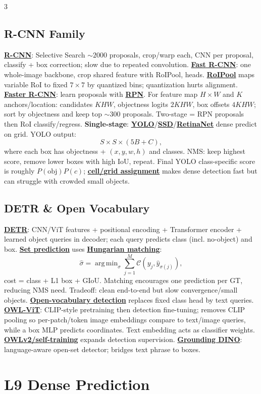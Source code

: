 \documentclass{article}
\numberwithin{equation}{subsection}
\newcommand{\key}[1]{\textbf{#1}}
\newcommand{\lowterm}[1]{\textbf{\underline{#1}}}
\DeclareMathOperator*{\argmin}{arg\,min}
\begin{document}
\begin{multicols*}{3}
\subsection{R-CNN Family}
\lowterm{R-CNN}: Selective Search $\sim2000$ proposals, crop/warp each, CNN per proposal, classify + box correction; slow due to repeated convolution. \lowterm{Fast R-CNN}: one whole-image backbone, crop shared feature with RoIPool, heads. \lowterm{RoIPool} maps variable RoI to fixed $7\times7$ by quantized bins; quantization hurts alignment. \lowterm{Faster R-CNN}: learn proposals with \lowterm{RPN}. For feature map $H\times W$ and $K$ anchors/location: candidates $KHW$, objectness logits $2KHW$, box offsets $4KHW$; sort by objectness and keep top $\sim300$ proposals. Two-stage = RPN proposals then RoI classify/regress.
\key{Single-stage}: \lowterm{YOLO}/\lowterm{SSD}/\lowterm{RetinaNet} dense predict on grid. YOLO output:
\[
S\times S\times(5B+C),
\]
where each box has objectness + $(x,y,w,h)$ and classes. NMS: keep highest score, remove lower boxes with high IoU, repeat.
Final YOLO class-specific score is roughly $P(\mathrm{obj})P(c)$; \lowterm{cell/grid assignment} makes dense detection fast but can struggle with crowded small objects.

\subsection{DETR \& Open Vocabulary}
\lowterm{DETR}: CNN/ViT features + positional encoding + Transformer encoder + learned object queries in decoder; each query predicts class (incl. no-object) and box. \lowterm{Set prediction} uses \lowterm{Hungarian matching}:
\[
\hat\sigma=\argmin_\sigma\sum_{j=1}^M \mathcal C(y_j,\hat y_{\sigma(j)}),
\]
cost = class + L1 box + GIoU. Matching encourages one prediction per GT, reducing NMS need. Tradeoff: clean end-to-end but slow convergence/small objects.
\lowterm{Open-vocabulary detection} replaces fixed class head by text queries. \lowterm{OWL-ViT}: CLIP-style pretraining then detection fine-tuning; removes CLIP pooling so per-patch/token image embeddings compare to text/image queries, while a box MLP predicts coordinates. Text embedding acts as classifier weights. \lowterm{OWLv2/self-training} expands detection supervision. \lowterm{Grounding DINO}: language-aware open-set detector; bridges text phrase to boxes.

\section{L9 Dense Prediction}

\end{multicols*}
\end{document}
